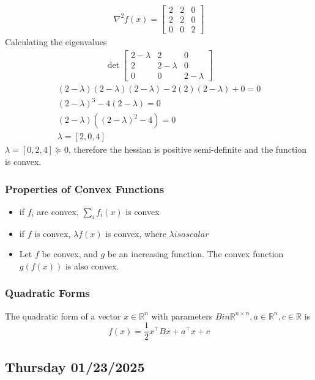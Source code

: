 \begin{align}
  \nabla^2 f(x) = 
  \begin{bmatrix}
     2 & 2 & 0 \\
     2 & 2 & 0 \\
     0 & 0 & 2
  \end{bmatrix}
\end{align}
Calculating the eigenvalues
\begin{align} \det
  \begin{bmatrix}
    2 - \lambda& 2 & 0 \\
    2 & 2 - \lambda & 0 \\
    0 & 0 & 2 - \lambda
  \end{bmatrix} 
\end{align}
\begin{gather}
  (2-\lambda)(2-\lambda)(2-\lambda) - 2(2)(2-\lambda) + 0= 0 \\
  (2-\lambda)^3 - 4(2-\lambda) = 0 \\
  (2-\lambda)((2-\lambda)^2 - 4) = 0 \\
  \lambda = [2, 0, 4]
\end{gather}
$\lambda = [0,2,4] \succeq 0$, therefore the hessian is positive semi-definite and the function is convex.
\subsubsection{Properties of Convex Functions}
\begin{itemize}
  \item if $f_i$ are convex, $\sum_i f_i(x)$ is convex
  \item if $f$ is convex, $\lambda f(x)$ is convex, where $\lambda is a scalar$
  \item Let $f$ be convex, and $g$ be an increasing function. The convex function $g(f(x))$ is also convex.
\end{itemize}

\subsubsection{Quadratic Forms}
The quadratic form of a vector $x \in \mathbb{R}^n$ with parameters $B in \mathbb{R}^{n \times n}, a \in \mathbb{R}^n, c \in \mathbb{R}$ is
\begin{equation}
  f(x) = \frac{1}{2} x^\top B x + a^\top x + c
\end{equation}

\subsection{Thursday 01/23/2025}

